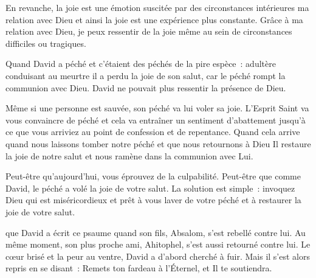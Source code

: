 En revanche, la joie est une émotion suscitée par des circonstances
 intérieures \ocadr ma relation avec Dieu \fcadr{} et ainsi la joie
 est une expérience plus constante.
 Grâce à ma relation avec Dieu, je peux ressentir de la joie
 même au sein de circonstances difficiles ou tragiques. 

Quand David a péché \ocadr et c'étaient des péchés de la pire espèce~:
 adultère conduisant au meurtre \fcadr{} il a perdu la joie de son salut,
 car le péché rompt la communion avec Dieu.
 David ne pouvait plus ressentir la présence de Dieu. 


Même si une personne est sauvée, son péché va lui voler sa joie.
 L'Esprit Saint 
 va vous convaincre de péché et cela va entraîner
 un sentiment d'abattement jusqu'à ce que vous arriviez au point de confession
 et de repentance.
 Quand cela arrive \ocadr quand nous laissons tomber notre péché
 et que nous retournons à Dieu \fcadr Il restaure la joie de notre salut
 et nous ramène dans la communion avec Lui. 

Peut-être qu'aujourd'hui, vous éprouvez de la culpabilité.
 Peut-être que comme David, le péché a volé la joie de votre salut.
 La solution est simple~: invoquez Dieu qui est miséricordieux
 et prêt à vous laver de votre péché et à restaurer la joie de votre salut.

\dvrule






 que David a écrit ce psaume quand son fils,
 Absalom, s'est rebellé contre lui.
 Au même moment, son plus proche ami, Ahitophel,
 s'est aussi retourné contre lui. Le cœur brisé et la peur au ventre,
 David a d'abord cherché à fuir.
 Mais il s'est alors repris en se disant~:
 \og Remets ton fardeau à l'Éternel, et Il te soutiendra. \fg{}

